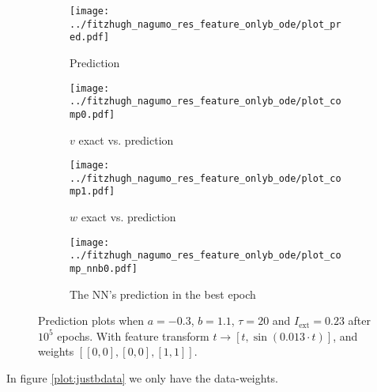 \documentclass[a4paper]{article}
\begin{document}
\begin{figure}[H]
	\centering 
	\begin{subfigure}[b]{0.47\textwidth}
		\centering
		\texttt{[image: ../fitzhugh\_nagumo\_res\_feature\_onlyb\_ode/plot\_pred.pdf]}
		\caption{Prediction}
		\label{fig:justbodea}
	\end{subfigure}
	\begin{subfigure}[b]{0.47\textwidth}
		\centering
		\texttt{[image: ../fitzhugh\_nagumo\_res\_feature\_onlyb\_ode/plot\_comp0.pdf]}
		\caption{$v$ exact vs. prediction}
		\label{fig:justbodeb}
	\end{subfigure}
	\begin{subfigure}[b]{0.47\textwidth}
		\centering
		\texttt{[image: ../fitzhugh\_nagumo\_res\_feature\_onlyb\_ode/plot\_comp1.pdf]}
		\caption{$w$ exact vs. prediction}
		\label{fig:justbodec}
	\end{subfigure}
	\begin{subfigure}[b]{0.47\textwidth}
		\centering
		\texttt{[image: ../fitzhugh\_nagumo\_res\_feature\_onlyb\_ode/plot\_comp\_nnb0.pdf]}
		\caption{The NN's prediction in the best epoch}
		\label{fig:justboded}
	\end{subfigure}
	\caption{Prediction plots when $a=-0.3$, $b=1.1$, $\tau=20$ and $ I_{\text{ext}}=0.23$ after $10^5$ epochs. With feature transform $t \rightarrow \left[ t, \sin(0.013\cdot t) \right] $, and weights $\left[ \left[ 0, 0\right], \left[ 0, 0\right], \left[ 1, 1\right]\right]$.}
	\label{plot:justbode}
\end{figure} 	


In figure \ref{plot:justbdata} we only have the data-weights. 
\end{document}
